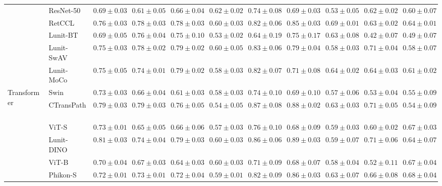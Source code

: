 \begin{tabular}{ll|cccc|c|cccc}
 & ResNet-50~\cite{he2015deep} & $0.69 \pm 0.03$ & $0.61 \pm 0.05$ & $0.66 \pm 0.04$ & $0.62 \pm 0.02$ & $0.74 \pm 0.08$ & $0.69 \pm 0.03$ & $0.53 \pm 0.05$ & $0.62 \pm 0.02$ & $0.60 \pm 0.07$ \\
 & RetCCL~\cite{wang2023retccl} & $0.76 \pm 0.03$ & $0.78 \pm 0.03$ & $0.78 \pm 0.03$ & $0.60 \pm 0.03$ & $0.82 \pm 0.06$ & $0.85 \pm 0.03$ & $\mathbf{0.69 \pm 0.01}$ & $0.63 \pm 0.02$ & $0.64 \pm 0.01$ \\
 & Lunit-BT~\cite{kang2023benchmarking} & $0.69 \pm 0.05$ & $0.76 \pm 0.04$ & $0.75 \pm 0.10$ & $0.53 \pm 0.02$ & $0.64 \pm 0.19$ & $0.75 \pm 0.17$ & $0.63 \pm 0.08$ & $0.42 \pm 0.07$ & $0.49 \pm 0.07$ \\
 & Lunit-SwAV~\cite{kang2023benchmarking} & $0.75 \pm 0.03$ & $0.78 \pm 0.02$ & $0.79 \pm 0.02$ & $0.60 \pm 0.05$ & $0.83 \pm 0.06$ & $0.79 \pm 0.04$ & $0.58 \pm 0.03$ & $0.71 \pm 0.04$ & $0.58 \pm 0.07$ \\
 & Lunit-MoCo~\cite{kang2023benchmarking} & $0.75 \pm 0.05$ & $0.74 \pm 0.01$ & $0.79 \pm 0.02$ & $0.58 \pm 0.03$ & $0.82 \pm 0.07$ & $0.71 \pm 0.08$ & $0.64 \pm 0.02$ & $0.64 \pm 0.03$ & $0.61 \pm 0.02$ \\
\cline{1-11}
\multirow[t]{14}{*}{Transformer} & Swin~\cite{liu2021swin} & $0.73 \pm 0.03$ & $0.66 \pm 0.04$ & $0.61 \pm 0.03$ & $0.58 \pm 0.03$ & $0.74 \pm 0.10$ & $0.69 \pm 0.10$ & $0.57 \pm 0.06$ & $0.53 \pm 0.04$ & $0.55 \pm 0.09$ \\
 & CTransPath~\cite{wang2022transformer} & $0.79 \pm 0.03$ & $\mathbf{0.79 \pm 0.03}$ & $0.76 \pm 0.05$ & $0.54 \pm 0.05$ & $0.87 \pm 0.08$ & $0.88 \pm 0.02$ & $0.63 \pm 0.03$ & $0.71 \pm 0.05$ & $0.54 \pm 0.09$ \\
 & ViT-S~\cite{kolesnikov2021image} & $0.73 \pm 0.01$ & $0.65 \pm 0.05$ & $0.66 \pm 0.06$ & $0.57 \pm 0.03$ & $0.76 \pm 0.10$ & $0.68 \pm 0.09$ & $0.59 \pm 0.03$ & $0.60 \pm 0.02$ & $0.67 \pm 0.03$ \\
 & Lunit-DINO~\cite{kang2023benchmarking} & $0.81 \pm 0.03$ & $0.74 \pm 0.04$ & $0.79 \pm 0.03$ & $0.60 \pm 0.03$ & $0.86 \pm 0.06$ & $0.89 \pm 0.03$ & $0.59 \pm 0.07$ & $0.71 \pm 0.06$ & $0.64 \pm 0.07$ \\
 & ViT-B~\cite{kolesnikov2021image} & $0.70 \pm 0.04$ & $0.67 \pm 0.03$ & $0.64 \pm 0.03$ & $0.60 \pm 0.03$ & $0.71 \pm 0.09$ & $0.68 \pm 0.07$ & $0.58 \pm 0.04$ & $0.52 \pm 0.11$ & $0.67 \pm 0.04$ \\
 & Phikon-S~\cite{filiot2023scaling} & $0.72 \pm 0.01$ & $0.73 \pm 0.01$ & $0.72 \pm 0.04$ & $0.59 \pm 0.01$ & $0.82 \pm 0.09$ & $0.86 \pm 0.03$ & $0.63 \pm 0.07$ & $0.66 \pm 0.08$ & $\mathbf{0.68 \pm 0.04}$ \\

\end{tabular}
